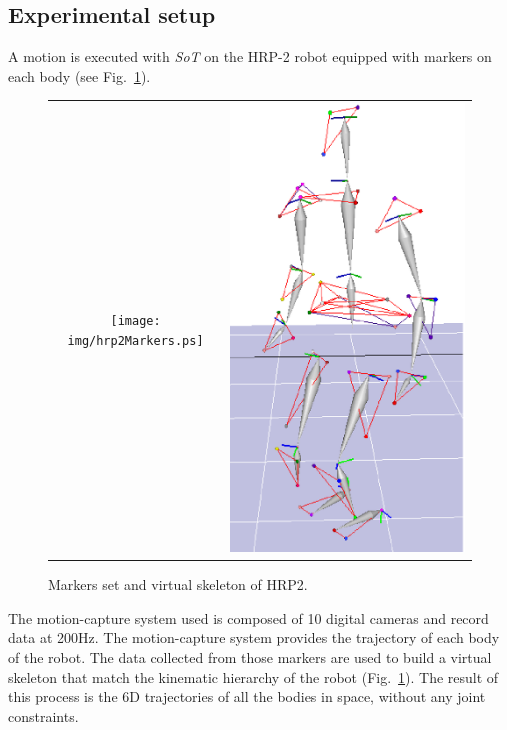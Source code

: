 \documentclass[journal]{IEEEtran}
\begin{document}
\subsection{Experimental setup}\label{sec:xpset}
A motion is executed with \emph{SoT} on the HRP-2 robot equipped with markers on each
body (see Fig.~\ref{fig:hrp2Markers}).
\begin{figure}[t]
  \centering
  \begin{tabular}{cc}
    \texttt{[image: img/hrp2Markers.ps]} &
    \includegraphics[height=0.7\linewidth]{img/skel.ps} \\
  \end{tabular}
  \caption{Markers set and virtual skeleton of HRP2.}
  \label{fig:hrp2Markers}
\end{figure}
The motion-capture system used is composed of 10 digital cameras and record data
at 200Hz. 
The motion-capture system provides the trajectory of each body of the robot.
The data collected from those markers
are used to build a virtual skeleton that match the kinematic hierarchy of the robot (Fig.~\ref{fig:hrp2Markers}).
The result of this process is the 6D trajectories of all the bodies in space, without any joint constraints.
\end{document}
